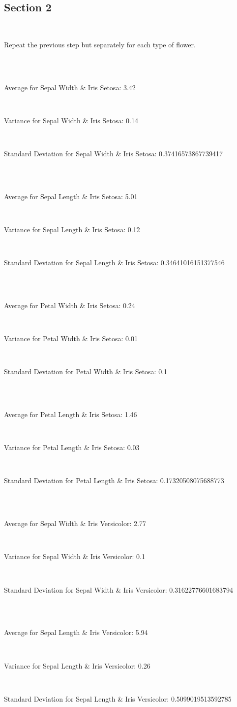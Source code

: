 \documentclass[12pt,a4paper,titlepage]{article}
\begin{document}
{{\subsection{Section 2}{
~\\
\centerline{Repeat the previous step but separately for each type of flower.}\\~\\
\centerline{Average for Sepal Width \& Iris Setosa: 3.42}\\
\centerline{Variance for Sepal Width \& Iris Setosa: 0.14}~\\
\centerline{Standard Deviation for Sepal Width \& Iris Setosa: 0.37416573867739417}~\\~\\
\centerline{Average for Sepal Length \& Iris Setosa: 5.01}~\\
\centerline{Variance for Sepal Length \& Iris Setosa: 0.12}~\\
\centerline{Standard Deviation for Sepal Length \& Iris Setosa: 0.34641016151377546}~\\~\\
\centerline{Average for Petal Width \& Iris Setosa: 0.24}~\\
\centerline{Variance for Petal Width \& Iris Setosa: 0.01}~\\
\centerline{Standard Deviation for Petal Width \& Iris Setosa: 0.1}~\\~\\
\centerline{Average for Petal Length \& Iris Setosa: 1.46}~\\
\centerline{Variance for Petal Length \& Iris Setosa: 0.03}~\\
\centerline{Standard Deviation for Petal Length \& Iris Setosa: 0.17320508075688773}~\\~\\
\centerline{Average for Sepal Width \& Iris Versicolor: 2.77}~\\
\centerline{Variance for Sepal Width \& Iris Versicolor: 0.1}~\\
\centerline{Standard Deviation for Sepal Width \& Iris Versicolor: 0.31622776601683794}~\\~\\
\centerline{Average for Sepal Length \& Iris Versicolor: 5.94}~\\
\centerline{Variance for Sepal Length \& Iris Versicolor: 0.26}~\\
\centerline{Standard Deviation for Sepal Length \& Iris Versicolor: 0.5099019513592785}~\\~\\
}}}
\end{document}
